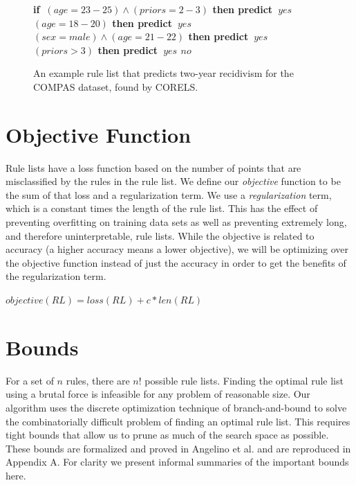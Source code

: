 \documentclass[]{report}
\theoremstyle{definition}
\def\bif{\bf if~}
\def\belif{{\bf else if~}}
\def\bthen{{\bf then predict~}}
\def\belse{{\bf else predict~}}
\begin{document}
\begin{figure}[t!]
\begin{algorithmic}
\normalsize
\State \bif $(age=23-25) \wedge (priors=2-3)$ \bthen $yes$
\State \belif $(age=18-20)$ \bthen $yes$
\State \belif $(sex=male) \wedge (age=21-22)$ \bthen $yes$
\State \belif $(priors>3)$ \bthen $yes$
\State \belse $no$
\end{algorithmic}
\caption{An example rule list that predicts two-year recidivism for the COMPAS dataset, found by CORELS.}
\label{fig:rule-list}
\end{figure}

\section{Objective Function}
Rule lists have a loss function based on the number of points that are misclassified by the rules in the rule list.
We define our \textit{objective} function to be the sum of that loss and a regularization term.
We use a \textit{regularization} term, which is a constant times the length of the rule list.
This has the effect of preventing overfitting on training data sets as well as preventing extremely long, and therefore uninterpretable, rule lists.
While the objective is related to accuracy (a higher accuracy means a lower objective), we will be optimizing over the objective function instead of just the accuracy in order to get the benefits of the regularization term.

\begin{math}
objective(RL) = loss(RL) + c * len(RL)
\end{math}

\section{Bounds}\label{sec:bounds}
For a set of $n$ rules, there are $n!$ possible rule lists.
Finding the optimal rule list using a brutal force is infeasible for any problem of reasonable size.
Our algorithm uses the discrete optimization technique of branch-and-bound to solve the combinatorially difficult problem of finding an optimal rule list.
This requires tight bounds that allow us to prune as much of the search space as possible.
These bounds are formalized and proved in Angelino et al. \cite{AngelinoLaAlSeRu17} and are reproduced in Appendix A.
For clarity we present informal summaries of the important bounds here.
\end{document}
